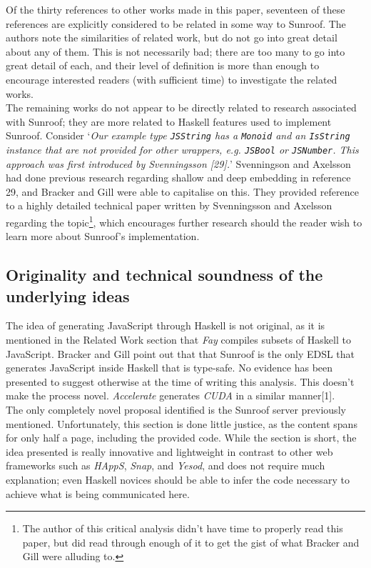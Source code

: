 \documentclass[9pt]{report}
\begin{document}
\noindent
Of the thirty references to other works made in this paper, seventeen of these references are explicitly considered to be related in some way to Sunroof.
The authors note the similarities of related work, but do not go into great detail about any of them.
This is not necessarily bad; there are too many to go into great detail of each, and their level of definition is more than enough to encourage interested readers (with sufficient time) to investigate the related works.\\

The remaining works do not appear to be directly related to research associated with Sunroof; they are more related to Haskell features used to implement Sunroof.
Consider `{\it Our example type \verb/JSString/ has a \verb/Monoid/ and an \verb/IsString/ instance that are not provided for other wrappers, e.g. \verb/JSBool/ or \verb/JSNumber/. This approach was first introduced by Svenningsson [29].}'
Svenningson and Axelsson had done previous research regarding shallow and deep embedding in reference 29, and Bracker and Gill were able to capitalise on this. They provided reference to a highly detailed technical paper written by Svenningsson and Axelsson regarding the topic\footnote{The author of this critical analysis didn't have time to properly read this paper, but did read through enough of it to get the gist of what Bracker and Gill were alluding to.}, which encourages further research should the reader wish to learn more about Sunroof's implementation.

\subsection*{Originality and technical soundness of the underlying ideas}
The idea of generating JavaScript through Haskell is not original, as it is mentioned in the Related Work section that {\it Fay} compiles subsets of Haskell to JavaScript.
Bracker and Gill point out that that Sunroof is the only EDSL that generates JavaScript inside Haskell that is type-safe.
No evidence has been presented to suggest otherwise at the time of writing this analysis.
This doesn't make the process novel.
{\it Accelerate} generates {\it CUDA} in a similar manner[1].\\

The only completely novel proposal identified is the Sunroof server previously mentioned.
Unfortunately, this section is done little justice, as the content spans for only half a page, including the provided code.
While the section is short, the idea presented is really innovative and lightweight in contrast to other web frameworks such as {\it HAppS}, {\it Snap}, and {\it Yesod}, and does not require much explanation; even Haskell novices should be able to infer the code necessary to achieve what is being communicated here.\\
\end{document}
